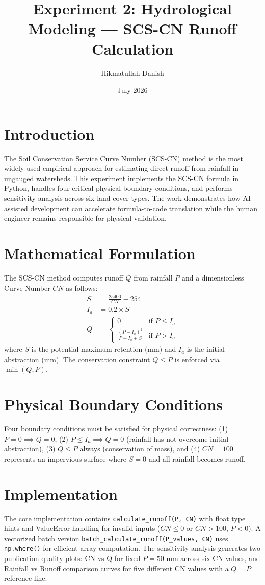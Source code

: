 \documentclass[12pt,a4paper]{article}
\title{Experiment 2: Hydrological Modeling — SCS-CN Runoff Calculation}
\author{Hikmatullah Danish \quad 3125999089}
\date{July 2026}
\begin{document}
\maketitle

\section{Introduction}
The Soil Conservation Service Curve Number (SCS-CN) method is the most widely used empirical approach for estimating direct runoff from rainfall in ungauged watersheds. This experiment implements the SCS-CN formula in Python, handles four critical physical boundary conditions, and performs sensitivity analysis across six land-cover types. The work demonstrates how AI-assisted development can accelerate formula-to-code translation while the human engineer remains responsible for physical validation.

\section{Mathematical Formulation}
The SCS-CN method computes runoff $Q$ from rainfall $P$ and a dimensionless Curve Number $CN$ as follows:
\begin{align}
S &= \frac{25400}{CN} - 254 \label{eq:S} \\
I_a &= 0.2 \times S \label{eq:Ia} \\
Q &= \begin{cases}
0 & \text{if } P \leq I_a \\
\displaystyle\frac{(P - I_a)^2}{P - I_a + S} & \text{if } P > I_a
\end{cases} \label{eq:Q}
\end{align}
where $S$ is the potential maximum retention (mm) and $I_a$ is the initial abstraction (mm). The conservation constraint $Q \leq P$ is enforced via $\min(Q, P)$.

\section{Physical Boundary Conditions}
Four boundary conditions must be satisfied for physical correctness: (1) $P = 0 \implies Q = 0$, (2) $P \leq I_a \implies Q = 0$ (rainfall has not overcome initial abstraction), (3) $Q \leq P$ always (conservation of mass), and (4) $CN = 100$ represents an impervious surface where $S = 0$ and all rainfall becomes runoff.

\section{Implementation}
The core implementation contains \texttt{calculate\_runoff(P, CN)} with float type hints and ValueError handling for invalid inputs ($CN \leq 0$ or $CN > 100$, $P < 0$). A vectorized batch version \texttt{batch\_calculate\_runoff(P\_values, CN)} uses \texttt{np.where()} for efficient array computation. The sensitivity analysis generates two publication-quality plots: CN vs Q for fixed $P = 50$ mm across six CN values, and Rainfall vs Runoff comparison curves for five different CN values with a $Q = P$ reference line.
\end{document}
